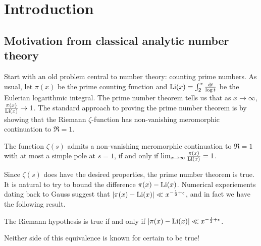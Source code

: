 
\chapter{Introduction}





\section{Motivation from classical analytic number theory}

Start with an old problem central to number theory: counting 
prime numbers. As usual, let $\pi(x)$ be the prime counting function and 
$\operatorname{Li}(x) = \int_2^x \frac{\mathrm{d} t}{\log t}$ be the Eulerian logarithmic integral. 
The prime number theorem tells us that as $x\to \infty$, 
$\frac{\pi(x)}{\operatorname{Li}(x)} \to 1$. The standard approach 
to proving the prime number theorem is by showing that the Riemann 
$\zeta$-function has non-vanishing meromorphic continuation to $\Re = 1$.

\begin{theorem}
The function $\zeta(s)$ admits a non-vanishing meromorphic continuation to 
$\Re = 1$ with at most a simple pole at $s=1$, if and only if 
$\lim_{x\to \infty} \frac{\pi(x)}{\operatorname{Li}(x)} = 1$. 
\end{theorem}

Since $\zeta(s)$ does have the desired properties, the prime number 
theorem is true. It is natural to try to bound the difference 
$\pi(x) - \operatorname{Li}(x)$. Numerical experiements dating back to Gauss 
suggest that $|\pi(x) - \operatorname{Li}(x)| \ll x^{-\frac 1 2+\epsilon}$, and in fact we 
have the following result. 

\begin{theorem}
The Riemann hypothesis is true if and only if 
$|\pi(x) - \operatorname{Li}(x)| \ll x^{-\frac 1 2+\epsilon}$. 
\end{theorem}

Neither side of this equivalence is known for certain to be true! 

